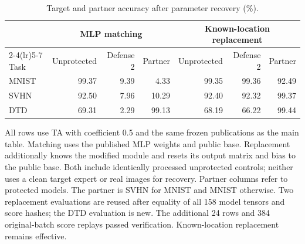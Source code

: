\begin{table}[t]
\centering\small
\caption{Target and partner accuracy after parameter recovery (\%).}
\label{tab:finite-classification-recovery}
\begin{tabular}{lrrrrrr}
\toprule
& \multicolumn{3}{c}{MLP matching} & \multicolumn{3}{c}{Known-location replacement} \\
\cmidrule(lr){2-4}\cmidrule(lr){5-7}
Task & Unprotected & Defense 2 & Partner & Unprotected & Defense 2 & Partner \\
\midrule
MNIST & 99.37 & 9.39 & 4.33 & 99.35 & 99.36 & 92.49 \\
SVHN & 92.50 & 7.96 & 10.29 & 92.40 & 92.32 & 99.37 \\
DTD & 69.31 & 2.29 & 99.13 & 68.19 & 66.22 & 99.44 \\
\bottomrule
\end{tabular}
\par\smallskip
\begin{minipage}{\textwidth}\footnotesize
All rows use TA with coefficient 0.5 and the same frozen publications as the main table. Matching uses the published MLP weights and public base. Replacement additionally knows the modified module and resets its output matrix and bias to the public base. Both include identically processed unprotected controls; neither uses a clean target expert or real images for recovery. Partner columns refer to protected models. The partner is SVHN for MNIST and MNIST otherwise. Two replacement evaluations are reused after equality of all 158 model tensors and score hashes; the DTD evaluation is new. The additional 24 rows and 384 original-batch score replays passed verification. Known-location replacement remains effective.
\end{minipage}
\end{table}

